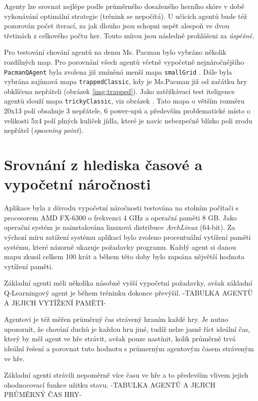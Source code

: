 Agenty lze srovnat nejlépe podle průměrného dosaženého herního skóre v době vykonávání optimální strategie (trénink se nepočítá). U učících agentů bude též pozorován počet iterací, za jak dlouho jsou schopni uspět alespoň ve dvou třetinách z celkového počtu her. Touto mírou jsou následně prohlášeni za \textit{úspěšné}. 

Pro testování chování agentů na demu Ms. Pacman bylo vybráno několik rozdílných map. Pro porovnání všech agentů včetně vypočetně nejnáročnějšího \texttt{PacmanQAgent} byla zvolena již zmíněná menší mapa \texttt{smallGrid} \label{img:smallL}. Dále byla vybrána zajímavá mapa \texttt{trappedClassic}, kdy je Ms.Pacman již od začátku hry obklíčena nepřáteli (obrázek \ref{img:trapped}). Jako zatěžkávací test iteligence agentů slouží mapa \texttt{trickyClassic}, viz obrázek \label{img:tricky}. Tato mapa o větším rozměru 20x13 polí obsahuje 3 nepřátele, 6 power-upů a především problematické místo o velikosti 5x4 polí plných kuliček jídla, které je navíc nebezpečně blízko poli zrodu nepřátel (\textit{spawning point}).

\section{Srovnání z hlediska časové a vypočetní náročnosti}
Aplikace byla z důvodu vypočetní náročnosti testována na stolním počítači s procesorem AMD FX-6300 o frekvenci 4 GHz a operační paměti 8 GB. Jako operační systém je nainstalována linuxová distribuce \textit{ArchLinux} (64-bit). Za výchozí míru zatížení systému aplikací bylo zvoleno procentuální vytížení paměti systému, které názorně ukazuje požadavky programu. Každý agent si danou mapu zkusil celkem 100 krát a během této doby bylo zapsána nějvětší hodnota vytížení paměti.

Základní agenti měli několika násobně vyšší vypočetní požadavky, avšak základní Q-Learningový agent je během tréninku dokonce převýšil.
-TABULKA AGENTŮ A JEJICH VYTÍŽENÍ PAMĚTI-


Agentovi je též měřen průměrný čas strávený hraním každé hry. Je nutno upozornit, že chování duchů je každou hru jiné, tudíž nelze jasně říct ideální čas, který by měl agent ve hře strávit, avšak pouze nastínit, kolik průměrně trvá ideální řešení a porovnat tuto hodnotu s průmerným agentovým časem stráveným ve hře.

Základní agenti strávili nepoměrně více času ve hře a to především vlivem jejich ohodnocovací funkce užitku stavu.
-TABULKA AGENTŮ A JEJICH PRŮMĚRNÝ ČAS HRY-

